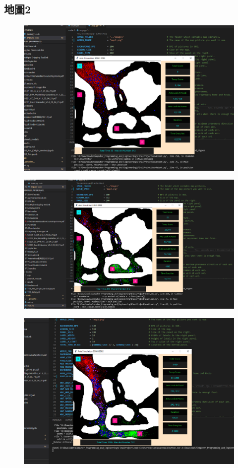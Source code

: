 \documentclass[]{article}
\begin{document}
\subsection{地圖2}
\begin{figure}[htbp]
	\centering
	\includegraphics[width=0.9\linewidth]{../record5}
	\label{fig:record5}
\end{figure}
\begin{figure}[htbp]
	\centering
	\includegraphics[width=0.9\linewidth]{../record6}
	\label{fig:record6}
\end{figure}
\begin{figure}[htbp]
	\centering
	\includegraphics[width=0.9\linewidth]{../record7}
	\label{fig:record7}
\end{figure}
\end{document}
